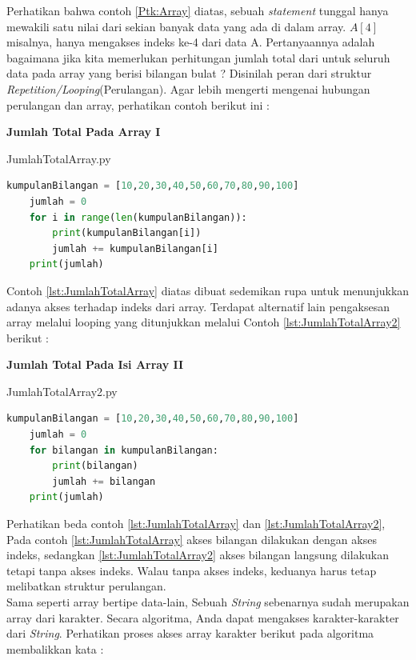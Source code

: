 Perhatikan bahwa contoh \ref{Ptk:Array} diatas, sebuah \textit{statement} tunggal hanya mewakili satu nilai dari sekian banyak data yang ada di dalam array. $A[4]$ misalnya, hanya mengakses indeks ke-4 dari data A. Pertanyaannya adalah bagaimana jika kita memerlukan perhitungan jumlah total dari untuk seluruh data pada array yang berisi bilangan bulat ? Disinilah peran dari struktur \textit{Repetition/Looping}(Perulangan). Agar lebih mengerti mengenai hubungan perulangan dan array, perhatikan contoh berikut ini : 
\pagebreak
 \begin{contoh}
	\textbf{ Jumlah Total Pada Array I}
\begin{listprog}{JumlahTotalArray.py}
\label{lst:JumlahTotalArray}
\begin{lstlisting}[language=Python]
	kumpulanBilangan = [10,20,30,40,50,60,70,80,90,100]
	jumlah = 0
	for i in range(len(kumpulanBilangan)):
		print(kumpulanBilangan[i])
		jumlah += kumpulanBilangan[i]
	print(jumlah)	
\end{lstlisting}
\end{listprog}
\end{contoh}

Contoh \ref{lst:JumlahTotalArray} diatas dibuat sedemikan rupa untuk menunjukkan adanya akses terhadap indeks dari array. Terdapat alternatif lain pengaksesan array melalui looping yang ditunjukkan melalui Contoh \ref{lst:JumlahTotalArray2} berikut : 

 \begin{contoh}
	\textbf{Jumlah Total Pada Isi Array II}
\begin{listprog}{JumlahTotalArray2.py}
\label{lst:JumlahTotalArray2}
\begin{lstlisting}[language=Python]
	kumpulanBilangan = [10,20,30,40,50,60,70,80,90,100]
	jumlah = 0
	for bilangan in kumpulanBilangan:
		print(bilangan)
		jumlah += bilangan
	print(jumlah)	
\end{lstlisting}
\end{listprog}
\end{contoh}

Perhatikan beda contoh \ref{lst:JumlahTotalArray} dan \ref{lst:JumlahTotalArray2}, Pada contoh \ref{lst:JumlahTotalArray} akses bilangan dilakukan dengan akses indeks, sedangkan \ref{lst:JumlahTotalArray2} akses bilangan langsung dilakukan tetapi tanpa akses indeks. Walau tanpa akses indeks, keduanya harus tetap melibatkan struktur perulangan.\\
Sama seperti array bertipe data-lain, Sebuah \textit{String} sebenarnya sudah merupakan array dari karakter. Secara algoritma, Anda dapat mengakses karakter-karakter dari \textit{String}. Perhatikan proses akses array karakter berikut pada algoritma membalikkan kata : 

